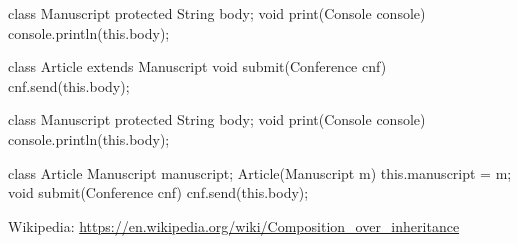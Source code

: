 \documentclass{article}
\begin{document}
\begin{multicols}{2}
{\small\begin{ffcode}
class Manuscript
  protected String body;
  void print(Console console)
    console.println(this.body);

class Article
  extends Manuscript
  void submit(Conference cnf)
    cnf.send(this.body);
\end{ffcode}
}
\par\columnbreak\par
{\small\begin{ffcode}
class Manuscript
  protected String body;
  void print(Console console)
    console.println(this.body);

class Article
  Manuscript manuscript;
  Article(Manuscript m)
    this.manuscript = m;
  void submit(Conference cnf)
    cnf.send(this.body);
\end{ffcode}
}
\end{multicols}\par
{\scriptsize Wikipedia: \url{https://en.wikipedia.org/wiki/Composition_over_inheritance}\par}
\plush{}

\end{document}

